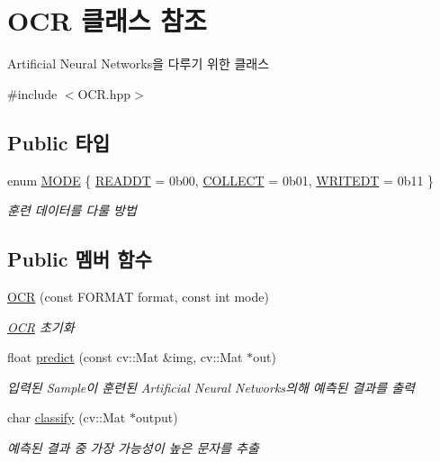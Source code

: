 \hypertarget{class_o_c_r}{}\section{O\+CR 클래스 참조}
\label{class_o_c_r}


Artificial Neural Networks을 다루기 위한 클래스  




{\ttfamily \#include $<$O\+C\+R.\+hpp$>$}

\subsection*{Public 타입}
\begin{DoxyCompactItemize}
\item 
enum \hyperlink{class_o_c_r_a442cab5841719df30befa282835b4eb3}{M\+O\+DE} \{ \hyperlink{class_o_c_r_a442cab5841719df30befa282835b4eb3a85eb8164b9c5fc654a6492994fe80289}{R\+E\+A\+D\+DT} = 0b00, 
\hyperlink{class_o_c_r_a442cab5841719df30befa282835b4eb3a885a5ee83c76766fe4189e8e90247797}{C\+O\+L\+L\+E\+CT} = 0b01, 
\hyperlink{class_o_c_r_a442cab5841719df30befa282835b4eb3a3439e4119033288be0dd0a3a00a2d6fd}{W\+R\+I\+T\+E\+DT} = 0b11
 \}\begin{DoxyCompactList}\small\item\em 훈련 데이터를 다룰 방법 \end{DoxyCompactList}
\end{DoxyCompactItemize}
\subsection*{Public 멤버 함수}
\begin{DoxyCompactItemize}
\item 
\hyperlink{class_o_c_r_a58dd005225af496e3ccdd69f387b5865}{O\+CR} (const F\+O\+R\+M\+AT format, const int mode)
\begin{DoxyCompactList}\small\item\em \hyperlink{class_o_c_r}{O\+CR} 초기화 \end{DoxyCompactList}\item 
float \hyperlink{class_o_c_r_aee086012d86e877ac029cdde3927a221}{predict} (const cv\+::\+Mat \&img, cv\+::\+Mat $\ast$out)
\begin{DoxyCompactList}\small\item\em 입력된 Sample이 훈련된 Artificial Neural Networks의해 예측된 결과를 출력 \end{DoxyCompactList}\item 
char \hyperlink{class_o_c_r_a3d521746f28d2843381c7d7e5eedddcd}{classify} (cv\+::\+Mat $\ast$output)
\begin{DoxyCompactList}\small\item\em 예측된 결과 중 가장 가능성이 높은 문자를 추출 \end{DoxyCompactList}\end{DoxyCompactItemize}
